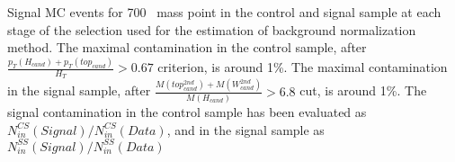\begin{frame}{}
\vspace{-.2cm}
\begin{center}
\end{center}

\vspace{-.2cm}
    \begin{block}{}
      \tiny \centering Signal MC events for 700 \GeVcc~mass point in the control and signal sample at each stage of the selection used for the estimation of background normalization method. The maximal contamination in the control sample, after $\frac{p_{T}(H_{cand})+p_{T}(top_{cand})}{H_{T}} > 0.67 $ criterion, is around 1\%. The maximal contamination in the signal sample, after $\frac{M(top^{2nd}_{cand})+M(W^{2nd}_{cand})}{M(H_{cand})}>6.8$ cut, is around 1\%. The signal contamination in the control sample has been evaluated as $N^{CS}_{in}(Signal)/N^{CS}_{in}(Data)$, and in the signal sample as $N^{SS}_{in}(Signal)/N^{SS}_{in}(Data)$
    \end{block}

\end{frame}

